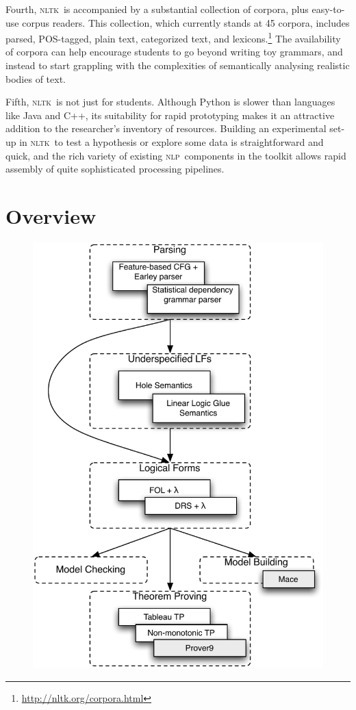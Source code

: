 \documentclass[11pt, a4paper]{article}
\newcommand{\NLP}{\textsc{nlp}}
\newcommand{\NLTK}{\textsc{nltk}}
\begin{document}
Fourth, \NLTK\ is accompanied by a substantial collection of corpora,
plus easy-to-use corpus readers.  This collection, which currently
stands at 45 corpora, includes parsed, POS-tagged, plain text,
categorized text, and
lexicons.\footnote{\url{http://nltk.org/corpora.html}} The
availability of corpora can help encourage students to go beyond
writing toy grammars, and instead to start grappling with the
complexities of semantically analysing realistic bodies of text.

Fifth, \NLTK\ is not just for students. Although Python is slower than
languages like Java and C++, its suitability for rapid prototyping
makes it an attractive addition to the researcher's inventory of
resources. Building an experimental set-up in \NLTK\ to test a
hypothesis or explore some data is straightforward and quick, and the
rich variety of existing \NLP\ components in the toolkit allows rapid
assembly of quite sophisticated processing pipelines.


\section{Overview}
\label{sec:overview}


\begin{figure}
  \centering
\includegraphics[scale=.6]{modules}  
\end{figure}
\end{document}
